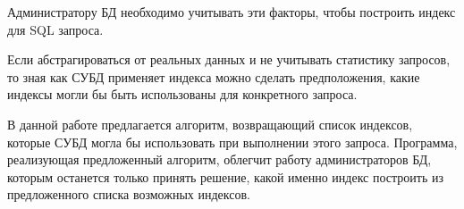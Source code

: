 Администратору БД необходимо учитывать эти факторы, чтобы построить индекс для SQL запроса.

Если абстрагироваться от реальных данных и не учитывать статистику запросов, то зная как СУБД применяет индекса можно сделать предположения, какие индексы могли бы быть использованы для конкретного запроса. 

В данной работе предлагается алгоритм, возвращающий список индексов, которые СУБД могла бы использовать при выполнении этого запроса. Программа, реализующая предложенный алгоритм, облегчит работу администраторов БД, которым останется только принять решение, какой именно индекс построить из предложенного списка возможных индексов.
